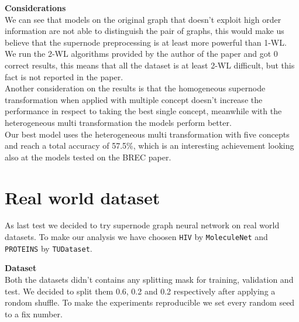 \documentclass[twoside,11pt]{article}
\begin{document}
\noindent
\textbf{Considerations}\\
We can see that models on the original graph that doesn't exploit high order information are not able to distinguish the pair of graphs, this would make us believe that the supernode preprocessing is at least more powerful than 1-WL. We run the 2-WL algorithms provided by the author of the paper and got 0 correct results, this means that all the dataset is at least 2-WL difficult, but this fact is not reported in the paper.\\
Another consideration on the results is that the homogeneous supernode transformation when applied with multiple concept doesn't increase the performance in respect to taking the best single concept, meanwhile with the heterogeneous multi transformation the models perform better.\\
Our best model uses the heterogeneous multi transformation with five concepts and reach a total accuracy of 57.5\%, which is an interesting achievement looking also at the models tested on the BREC paper.




\section{Real world dataset} %
\label{sec:real_world_dataset}

As last test we decided to try supernode graph neural network on real world datasets.
To make our analysis we have choosen \texttt{HIV} by \texttt{MoleculeNet} and \texttt{PROTEINS} by \texttt{TUDataset}.

\noindent
\textbf{Dataset}\\
Both the datasets didn't contains any splitting mask for training, validation and test. We decided to split them 0.6, 0.2 and 0.2 respectively after applying a rondom shuffle. To make the experiments reproducible we set every random seed to a fix number.\\

\noindent
{}\\
\end{document}
